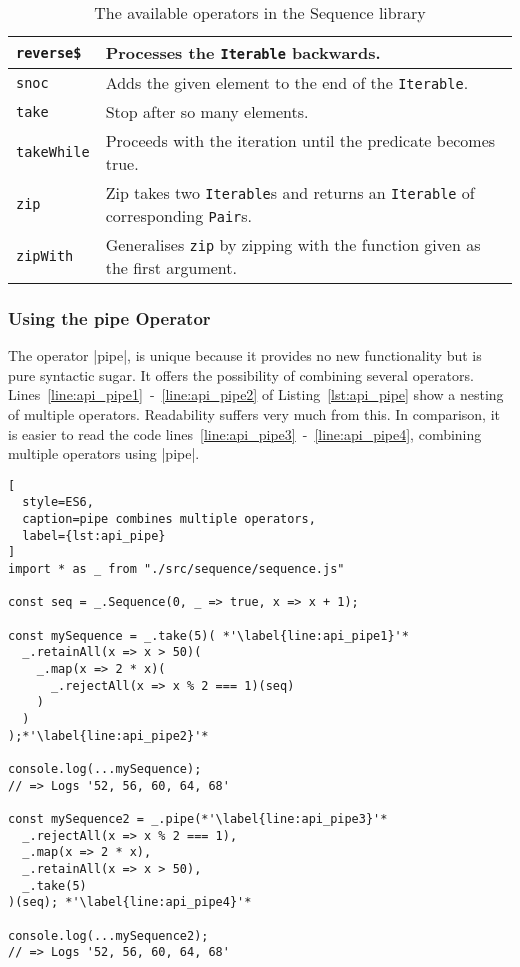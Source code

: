 \begin{table}[H]
\begin{tabularx}{\textwidth}{| l | X |}
    \texttt{reverse\$} & Processes the \texttt{Iterable} backwards. \\ \hline 
    \texttt{snoc} & Adds the given element to the end of the \texttt{Iterable}. \\ \hline 
    \texttt{take} & Stop after so many elements. \\ \hline 
    \texttt{takeWhile} & Proceeds with the iteration until the predicate becomes true. \\ \hline 
    \texttt{zip} & Zip takes two \texttt{Iterable}s and returns an \texttt{Iterable} of corresponding \texttt{Pair}s. \\ \hline 
    \texttt{zipWith} & Generalises \texttt{zip} by zipping with the function given as the first argument. \\ \hline 
  \end{tabularx}
  \caption{The available operators in the Sequence library}
  \label{tab:api_operators}
\end{table}

\subsubsection{Using the pipe Operator} %
The operator |pipe|, is unique because it provides no new functionality but is
pure syntactic sugar. It offers the possibility of combining several operators.
Lines~\ref{line:api_pipe1}~-~\ref{line:api_pipe2} of Listing~\ref{lst:api_pipe}
show a nesting of multiple operators. Readability suffers very much from this.
In comparison, it is easier to read the code 
lines~\ref{line:api_pipe3}~-~\ref{line:api_pipe4}, combining multiple operators
using |pipe|.

\begin{lstlisting}[
  style=ES6,
  caption=pipe combines multiple operators,
  label={lst:api_pipe}
]
import * as _ from "./src/sequence/sequence.js"

const seq = _.Sequence(0, _ => true, x => x + 1);

const mySequence = _.take(5)( *'\label{line:api_pipe1}'*
  _.retainAll(x => x > 50)(
    _.map(x => 2 * x)(
      _.rejectAll(x => x % 2 === 1)(seq)
    )
  )
);*'\label{line:api_pipe2}'*

console.log(...mySequence);
// => Logs '52, 56, 60, 64, 68'

const mySequence2 = _.pipe(*'\label{line:api_pipe3}'*
  _.rejectAll(x => x % 2 === 1),
  _.map(x => 2 * x),
  _.retainAll(x => x > 50),
  _.take(5)
)(seq); *'\label{line:api_pipe4}'*

console.log(...mySequence2);
// => Logs '52, 56, 60, 64, 68'

\end{lstlisting}


